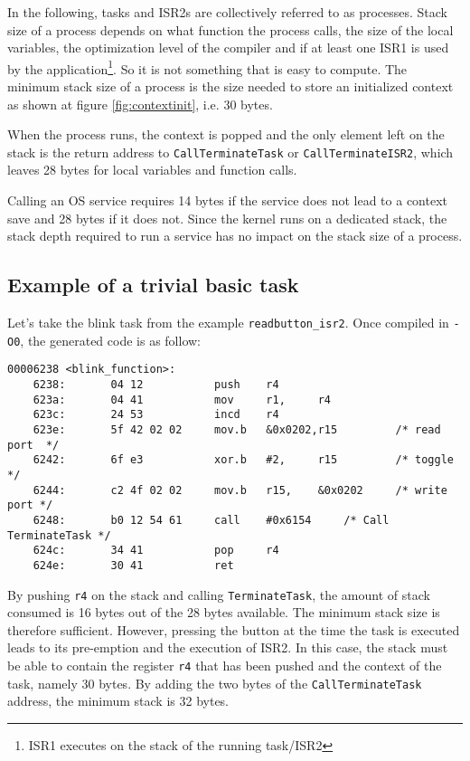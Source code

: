 \documentclass[11pt, oneside]{article}   	%
\begin{document}
In the following, tasks and ISR2s are collectively referred to as processes. Stack size of a process depends on what function the process calls, the size of the local variables, the optimization level of the compiler and if at least one ISR1 is used by the application\footnote{ISR1 executes on the stack of the running task/ISR2}. So it is not something that is easy to compute. The minimum stack size of a process is the size needed to store an initialized context as shown at figure \ref{fig:contextinit}, i.e. 30 bytes.

When the process runs, the context is popped and the only element left on the stack is the return address to \lstinline{CallTerminateTask} or \lstinline{CallTerminateISR2}, which leaves 28 bytes for local variables and function calls.

Calling an OS service requires 14 bytes if the service does not lead to a context save and 28 bytes if it does not. Since the kernel runs on a dedicated stack, the stack depth required to run a service has no impact on the stack size of a process.

\subsection*{Example of a trivial basic task}

Let's take the blink task from the example \lstinline{readbutton_isr2}. Once compiled in \lstinline{-O0}, the generated code is as follow:

\begin{lstlisting}[basicstyle=\footnotesize\ttfamily]
00006238 <blink_function>:
    6238:       04 12           push    r4              
    623a:       04 41           mov     r1,     r4      
    623c:       24 53           incd    r4              
    623e:       5f 42 02 02     mov.b   &0x0202,r15         /* read port  */
    6242:       6f e3           xor.b   #2,     r15         /* toggle     */
    6244:       c2 4f 02 02     mov.b   r15,    &0x0202     /* write port */
    6248:       b0 12 54 61     call    #0x6154     /* Call TerminateTask */
    624c:       34 41           pop     r4              
    624e:       30 41           ret                     
\end{lstlisting}

By pushing \lstinline{r4} on the stack and calling \lstinline{TerminateTask}, the amount of stack consumed is 16 bytes out of the 28 bytes available. The minimum stack size is therefore sufficient. However, pressing the button at the time the task is executed leads to its pre-emption and the execution of ISR2. In this case, the stack must be able to contain the register \lstinline{r4} that has been pushed and the context of the task, namely 30 bytes. By adding the two bytes of the \lstinline{CallTerminateTask} address, the minimum stack is 32 bytes.
\end{document}
